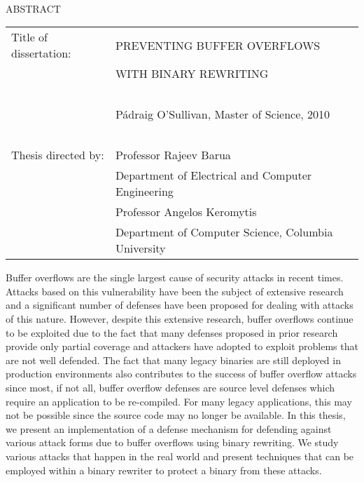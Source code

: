 
\hbox{\ }

\renewcommand{\baselinestretch}{1}
\small \normalsize

\begin{center}
\large{{ABSTRACT}} 

\vspace{3em} 

\end{center}
\hspace{-.15in}
\begin{tabular}{ll}
Title of dissertation:    & {\large  PREVENTING BUFFER OVERFLOWS}\\
&				      {\large  WITH BINARY REWRITING} \\
\ \\
&                          {\large  P\'{a}draig O'Sullivan, Master of Science, 2010} \\
\ \\
Thesis directed by: & {\large  Professor Rajeev Barua} \\
&  				{\large	 Department of Electrical and Computer Engineering} \\
&  				{\large	 Professor Angelos Keromytis} \\
&  				{\large	 Department of Computer Science, Columbia University} \\
\end{tabular}

\vspace{3em}

\renewcommand{\baselinestretch}{2}
\large \normalsize

Buffer overflows are the single largest cause of security attacks in recent times. Attacks based on
this vulnerability have been the subject of extensive research and a significant number of defenses
have been proposed for dealing with attacks of this nature. However, despite this extensive
research, buffer overflows continue to be exploited due to the fact that many defenses proposed in
prior research provide only partial coverage and attackers have adopted to exploit problems that are
not well defended. The fact that many legacy binaries are still deployed in production environments
also contributes to the success of buffer overflow attacks since most, if not all, buffer overflow
defenses are source level defenses which require an application to be re-compiled. For many legacy
applications, this may not be possible since the source code may no longer be available. In this
thesis, we present an implementation of a defense mechanism for defending against various attack
forms due to buffer overflows using binary rewriting. We study various attacks that happen in the
real world and present techniques that can be employed within a binary rewriter to protect a binary
from these attacks.

